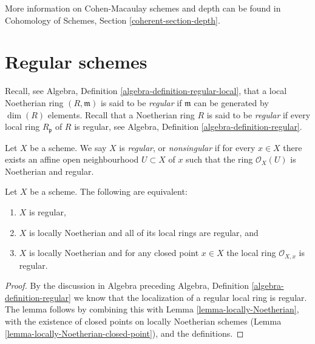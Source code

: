 \noindent
More information on Cohen-Macaulay schemes and depth can be found in
Cohomology of Schemes, Section \ref{coherent-section-depth}.








\section{Regular schemes}
\label{section-regular}

\noindent
Recall, see Algebra, Definition \ref{algebra-definition-regular-local},
that a local Noetherian ring $(R, \mathfrak m)$ is
said to be {\it regular} if $\mathfrak m$ can be generated
by $\dim(R)$ elements.
Recall that a Noetherian ring $R$ is said to be {\it regular} if
every local ring $R_{\mathfrak p}$ of $R$ is regular,
see Algebra, Definition \ref{algebra-definition-regular}.

\begin{definition}
\label{definition-regular}
Let $X$ be a scheme. We say $X$ is {\it regular}, or {\it nonsingular} if
for every $x \in X$ there exists an affine open neighbourhood
$U \subset X$ of $x$ such that the ring $\mathcal{O}_X(U)$ is
Noetherian and regular.
\end{definition}

\begin{lemma}
\label{lemma-characterize-regular}
Let $X$ be a scheme. The following are equivalent:
\begin{enumerate}
\item $X$ is regular,
\item $X$ is locally Noetherian and all of its local rings are regular,
and
\item $X$ is locally Noetherian and for any closed point $x \in X$
the local ring $\mathcal{O}_{X, x}$ is regular.
\end{enumerate}
\end{lemma}

\begin{proof}
By the discussion in Algebra preceding Algebra, Definition
\ref{algebra-definition-regular} we know that the localization of
a regular local ring is regular. The lemma follows
by combining this with Lemma \ref{lemma-locally-Noetherian},
with the existence of closed
points on locally Noetherian schemes
(Lemma \ref{lemma-locally-Noetherian-closed-point}), and
the definitions.
\end{proof}


